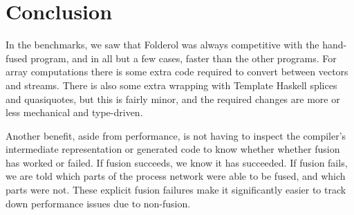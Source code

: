 \section{Conclusion}
In the benchmarks, we saw that Folderol was always competitive with the hand-fused program, and in all but a few cases, faster than the other programs.
For array computations there is some extra code required to convert between vectors and streams.
There is also some extra wrapping with Template Haskell splices and quasiquotes, but this is fairly minor, and the required changes are more or less mechanical and type-driven.

Another benefit, aside from performance, is not having to inspect the compiler's intermediate representation or generated code to know whether whether fusion has worked or failed.
If fusion succeeds, we know it has succeeded.
If fusion fails, we are told which parts of the process network were able to be fused, and which parts were not.
These explicit fusion failures make it significantly easier to track down performance issues due to non-fusion.

